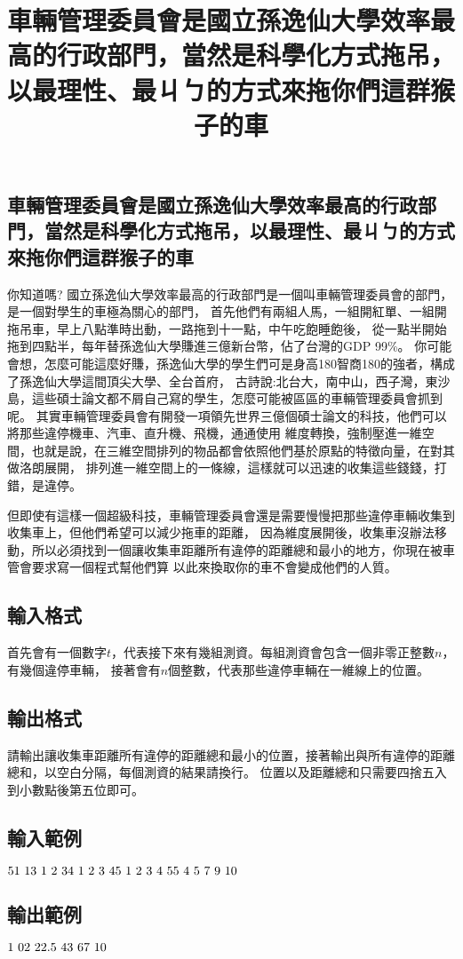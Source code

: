 \documentclass{article}
\title{車輛管理委員會是國立孫逸仙大學效率最高的行政部門，當然是科學化方式拖吊，以最理性、最ㄐㄅ的方式來拖你們這群猴子的車}
\begin{document}
\begin{CJK*}{UTF8}{bsmi}

\maketitle

\section*{車輛管理委員會是國立孫逸仙大學效率最高的行政部門，當然是科學化方式拖吊，以最理性、最ㄐㄅ的方式來拖你們這群猴子的車}

你知道嗎? 國立孫逸仙大學效率最高的行政部門是一個叫車輛管理委員會的部門，是一個對學生的車極為關心的部門，
首先他們有兩組人馬，一組開紅單、一組開拖吊車，早上八點準時出動，一路拖到十一點，中午吃飽睡飽後，
從一點半開始拖到四點半，每年替孫逸仙大學賺進三億新台幣，佔了台灣的GDP 99\%。
你可能會想，怎麼可能這麼好賺，孫逸仙大學的學生們可是身高180智商180的強者，構成了孫逸仙大學這間頂尖大學、全台首府，
古詩說:北台大，南中山，西子灣，東沙島，這些碩士論文都不屑自己寫的學生，怎麼可能被區區的車輛管理委員會抓到呢。
其實車輛管理委員會有開發一項領先世界三億個碩士論文的科技，他們可以將那些違停機車、汽車、直升機、飛機，通通使用
維度轉換，強制壓進一維空間，也就是說，在三維空間排列的物品都會依照他們基於原點的特徵向量，在對其做洛朗展開，
排列進一維空間上的一條線，這樣就可以迅速的收集這些錢錢，打錯，是違停。

但即使有這樣一個超級科技，車輛管理委員會還是需要慢慢把那些違停車輛收集到收集車上，但他們希望可以減少拖車的距離，
因為維度展開後，收集車沒辦法移動，所以必須找到一個讓收集車距離所有違停的距離總和最小的地方，你現在被車管會要求寫一個程式幫他們算
以此來換取你的車不會變成他們的人質。

\subsection*{輸入格式}
首先會有一個數字$t$，代表接下來有幾組測資。每組測資會包含一個非零正整數$n$，有幾個違停車輛，
接著會有$n$個整數，代表那些違停車輛在一維線上的位置。

\subsection*{輸出格式}
請輸出讓收集車距離所有違停的距離總和最小的位置，接著輸出與所有違停的距離總和，以空白分隔，每個測資的結果請換行。
位置以及距離總和只需要四捨五入到小數點後第五位即可。

\subsection*{輸入範例}
$5\\1\ 1\\3\ 1\ 2\ 3\\4\ 1\ 2\ 3\ 4\\5\ 1\ 2\ 3\ 4\ 5\\5\ 4\ 5\ 7\ 9\ 10$

\subsection*{輸出範例}
$1\ 0\\2\ 2\\2.5\ 4\\3\ 6\\7\ 10$

\end{CJK*}
\end{document}
